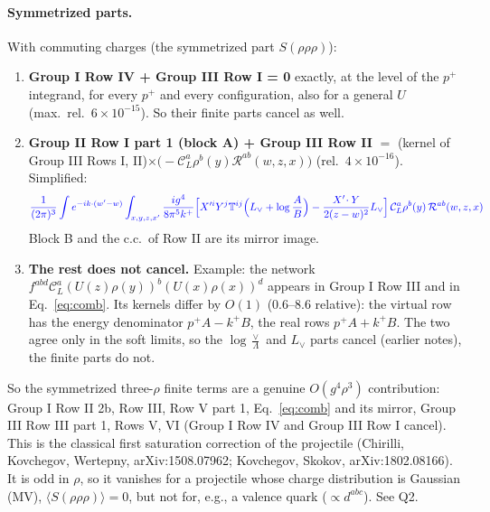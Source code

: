 \documentclass[10pt]{article}
\numberwithin{equation}{section}
\newcommand{\new}[1]{{\color{blue}#1}}
\newcommand{\Lv}{L_{\vee}}
\newcommand{\CL}{\mathcal C_L}
\newcommand{\Rc}{\mathcal R}
\newcommand{\pre}{\frac{1}{(2\pi)^3}}
\newcommand{\phw}{e^{-ik\cdot(w'-w)}}
\begin{document}
\paragraph{Symmetrized parts.} With commuting charges (the symmetrized part $S(\rho\rho\rho)$):
\begin{enumerate}
\item \textbf{Group I Row IV + Group III Row I = 0} exactly, at the level of the $p^+$ integrand, for every $p^+$ and every configuration, also for a general $U$ (max.\ rel.\ $6\times10^{-15}$). So their finite parts cancel as well.
\item \textbf{Group II Row I part 1 (block A) + Group III Row II} $=$ (kernel of Group III Rows I, II)$\times\big(-\CL^a\rho^b(y)\Rc^{ab}(w,z,x)\big)$ (rel.\ $4\times10^{-16}$). Simplified:
\begin{equation}
\new{\pre\int\phw\int_{x,y,z,x'}\frac{ig^4}{8\pi^5k^+}\Big[X'^iY^j\mathbb T^{ij}\Big(\Lv+\log\frac AB\Big)-\frac{X'\!\cdot Y}{2(z-w)^2}\Lv\Big]\,\CL^a\rho^b(y)\,\Rc^{ab}(w,z,x)}
\label{eq:comb}
\end{equation}
Block B and the c.c.\ of Row II are its mirror image.
\item \textbf{The rest does not cancel.} Example: the network $f^{abd}\CL^a(U(z)\rho(y))^b(U(x)\rho(x))^d$ appears in Group I Row III and in Eq.~\eqref{eq:comb}. Its kernels differ by $O(1)$ (0.6--8.6 relative): the virtual row has the energy denominator $p^+A-k^+B$, the real rows $p^+A+k^+B$. The two agree only in the soft limits, so the $\log\frac\vee\Lambda$ and $\Lv$ parts cancel (earlier notes), the finite parts do not.
\end{enumerate}
So the symmetrized three-$\rho$ finite terms are a genuine $O(g^4\rho^3)$ contribution: Group I Row II 2b, Row III, Row V part 1, Eq.~\eqref{eq:comb} and its mirror, Group III Row III part 1, Rows V, VI (Group I Row IV and Group III Row I cancel). This is the classical first saturation correction of the projectile (Chirilli, Kovchegov, Wertepny, arXiv:1508.07962; Kovchegov, Skokov, arXiv:1802.08166). It is odd in $\rho$, so it vanishes for a projectile whose charge distribution is Gaussian (MV), $\langle S(\rho\rho\rho)\rangle=0$, but not for, e.g., a valence quark ($\propto d^{abc}$). See Q2.
\end{document}
